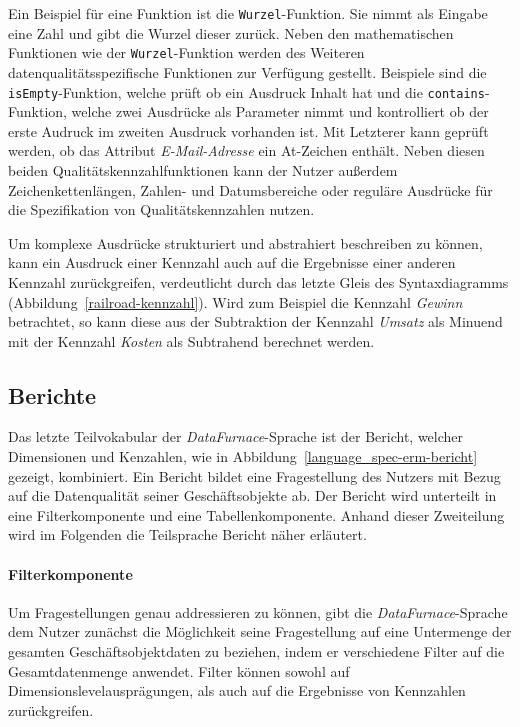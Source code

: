 \documentclass[
  language=german, %
  type=bachelor%
]{isthesis}
\begin{document}
\begin{content}
  Ein Beispiel für eine Funktion ist die \texttt{Wurzel}-Funktion.  Sie nimmt
  als Eingabe eine Zahl und gibt die Wurzel dieser zurück. Neben den
  mathematischen Funktionen wie der \texttt{Wurzel}-Funktion werden des
  Weiteren datenqualitätsspezifische Funktionen zur Verfügung gestellt.
  Beispiele sind die \texttt{isEmpty}-Funktion, welche prüft ob ein Ausdruck
  Inhalt hat und die \texttt{contains}-Funktion, welche zwei Ausdrücke als
  Parameter nimmt und kontrolliert ob der erste Audruck im zweiten Ausdruck
  vorhanden ist. Mit Letzterer kann \zB{} geprüft werden, ob das Attribut
  \textit{E-Mail-Adresse} ein At-Zeichen enthält. Neben diesen beiden
  Qualitätskennzahlfunktionen kann der Nutzer außerdem Zeichenkettenlängen,
  Zahlen- und Datumsbereiche oder reguläre Ausdrücke für die Spezifikation
  von Qualitätskennzahlen nutzen.

  Um komplexe Ausdrücke strukturiert und abstrahiert beschreiben zu können,
  kann ein Ausdruck einer Kennzahl auch auf die Ergebnisse einer anderen
  Kennzahl zurückgreifen, verdeutlicht durch das letzte Gleis des
  Syntaxdiagramms (Abbildung~\ref{railroad-kennzahl}). Wird zum Beispiel die
  Kennzahl \textit{Gewinn} betrachtet, so kann diese aus der Subtraktion der
  Kennzahl \textit{Umsatz} als Minuend mit der Kennzahl \textit{Kosten} als
  Subtrahend berechnet werden.


  \subsection{Berichte}

  Das letzte Teilvokabular der \textit{DataFurnace}-Sprache ist der Bericht,
  welcher Dimensionen und Kenzahlen, wie in
  Abbildung~\ref{language_spec-erm-bericht} gezeigt, kombiniert. Ein Bericht
  bildet eine Fragestellung des Nutzers mit Bezug auf die Datenqualität seiner
  Geschäftsobjekte ab. Der Bericht wird unterteilt in eine Filterkomponente und
  eine Tabellenkomponente. Anhand dieser Zweiteilung wird im Folgenden die
  Teilsprache Bericht näher erläutert.

  \begin{figure}[caption={Bericht-Teilsprache}, label={language_spec-erm-bericht}]
    \resizebox{120px}{!}{}
  \end{figure}
  
  \paragraph{Filterkomponente}\label{paragraph:filternde-komponente} Um
  Fragestellungen genau addressieren zu können, gibt die
  \textit{DataFurnace}-Sprache dem Nutzer zunächst die Möglichkeit seine
  Fragestellung auf eine Untermenge der gesamten Geschäftsobjektdaten zu
  beziehen, indem er verschiedene Filter auf die Gesamtdatenmenge anwendet.
  Filter können sowohl auf Dimensionslevelausprägungen, als auch auf die
  Ergebnisse von Kennzahlen zurückgreifen. 
  

\end{content}
\end{document}
